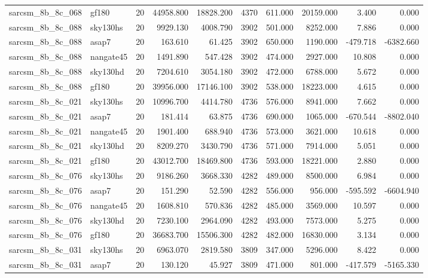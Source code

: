 \begin{tabular}{llrrrrrrrr}
sarcsm\_8b\_8c\_068 & gf180 & 20 & 44958.800 & 18828.200 & 4370 & 611.000 & 20159.000 & 3.400 & 0.000 \\
sarcsm\_8b\_8c\_088 & sky130hs & 20 & 9929.130 & 4008.790 & 3902 & 501.000 & 8252.000 & 7.886 & 0.000 \\
sarcsm\_8b\_8c\_088 & asap7 & 20 & 163.610 & 61.425 & 3902 & 650.000 & 1190.000 & -479.718 & -6382.660 \\
sarcsm\_8b\_8c\_088 & nangate45 & 20 & 1491.890 & 547.428 & 3902 & 474.000 & 2927.000 & 10.808 & 0.000 \\
sarcsm\_8b\_8c\_088 & sky130hd & 20 & 7204.610 & 3054.180 & 3902 & 472.000 & 6788.000 & 5.672 & 0.000 \\
sarcsm\_8b\_8c\_088 & gf180 & 20 & 39956.000 & 17146.100 & 3902 & 538.000 & 18223.000 & 4.615 & 0.000 \\
sarcsm\_8b\_8c\_021 & sky130hs & 20 & 10996.700 & 4414.780 & 4736 & 576.000 & 8941.000 & 7.662 & 0.000 \\
sarcsm\_8b\_8c\_021 & asap7 & 20 & 181.414 & 63.875 & 4736 & 690.000 & 1065.000 & -670.544 & -8802.040 \\
sarcsm\_8b\_8c\_021 & nangate45 & 20 & 1901.400 & 688.940 & 4736 & 573.000 & 3621.000 & 10.618 & 0.000 \\
sarcsm\_8b\_8c\_021 & sky130hd & 20 & 8209.270 & 3430.790 & 4736 & 571.000 & 7914.000 & 5.051 & 0.000 \\
sarcsm\_8b\_8c\_021 & gf180 & 20 & 43012.700 & 18469.800 & 4736 & 593.000 & 18221.000 & 2.880 & 0.000 \\
sarcsm\_8b\_8c\_076 & sky130hs & 20 & 9186.260 & 3668.330 & 4282 & 489.000 & 8500.000 & 6.984 & 0.000 \\
sarcsm\_8b\_8c\_076 & asap7 & 20 & 151.290 & 52.590 & 4282 & 556.000 & 956.000 & -595.592 & -6604.940 \\
sarcsm\_8b\_8c\_076 & nangate45 & 20 & 1608.810 & 570.836 & 4282 & 485.000 & 3569.000 & 10.597 & 0.000 \\
sarcsm\_8b\_8c\_076 & sky130hd & 20 & 7230.100 & 2964.090 & 4282 & 493.000 & 7573.000 & 5.275 & 0.000 \\
sarcsm\_8b\_8c\_076 & gf180 & 20 & 36683.700 & 15506.300 & 4282 & 482.000 & 16830.000 & 3.134 & 0.000 \\
sarcsm\_8b\_8c\_031 & sky130hs & 20 & 6963.070 & 2819.580 & 3809 & 347.000 & 5296.000 & 8.422 & 0.000 \\
sarcsm\_8b\_8c\_031 & asap7 & 20 & 130.120 & 45.927 & 3809 & 471.000 & 801.000 & -417.579 & -5165.330 \\

\end{tabular}
